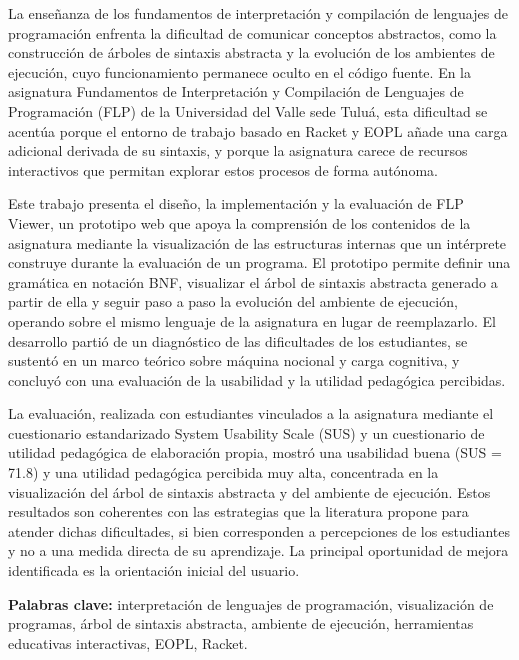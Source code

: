 La enseñanza de los fundamentos de interpretación y compilación de lenguajes de programación enfrenta la dificultad de comunicar conceptos abstractos, como la construcción de árboles de sintaxis abstracta y la evolución de los ambientes de ejecución, cuyo funcionamiento permanece oculto en el código fuente. En la asignatura Fundamentos de Interpretación y Compilación de Lenguajes de Programación (FLP) de la Universidad del Valle sede Tuluá, esta dificultad se acentúa porque el entorno de trabajo basado en Racket y EOPL añade una carga adicional derivada de su sintaxis, y porque la asignatura carece de recursos interactivos que permitan explorar estos procesos de forma autónoma.

Este trabajo presenta el diseño, la implementación y la evaluación de FLP Viewer, un prototipo web que apoya la comprensión de los contenidos de la asignatura mediante la visualización de las estructuras internas que un intérprete construye durante la evaluación de un programa. El prototipo permite definir una gramática en notación BNF, visualizar el árbol de sintaxis abstracta generado a partir de ella y seguir paso a paso la evolución del ambiente de ejecución, operando sobre el mismo lenguaje de la asignatura en lugar de reemplazarlo. El desarrollo partió de un diagnóstico de las dificultades de los estudiantes, se sustentó en un marco teórico sobre máquina nocional y carga cognitiva, y concluyó con una evaluación de la usabilidad y la utilidad pedagógica percibidas.

La evaluación, realizada con estudiantes vinculados a la asignatura mediante el cuestionario estandarizado System Usability Scale (SUS) y un cuestionario de utilidad pedagógica de elaboración propia, mostró una usabilidad buena (SUS = 71.8) y una utilidad pedagógica percibida muy alta, concentrada en la visualización del árbol de sintaxis abstracta y del ambiente de ejecución. Estos resultados son coherentes con las estrategias que la literatura propone para atender dichas dificultades, si bien corresponden a percepciones de los estudiantes y no a una medida directa de su aprendizaje. La principal oportunidad de mejora identificada es la orientación inicial del usuario.

\vspace{1em}
\noindent\textbf{Palabras clave:} interpretación de lenguajes de programación, visualización de programas, árbol de sintaxis abstracta, ambiente de ejecución, herramientas educativas interactivas, EOPL, Racket.
